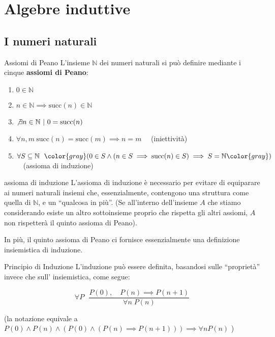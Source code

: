 \documentclass[a4paper,11pt]{report}
\begin{document}
\makefrontpage

\tableofcontents

\chapter{Algebre induttive}

\section{I numeri naturali}

\begin{defbox}{Assiomi di Peano}{}
    L'insieme \(\mathbb{N}\) dei numeri naturali si può definire mediante i cinque \textbf{assiomi di Peano}:
    \begin{enumerate}
        \item \( 0 \in \mathbb{N} \)
        \item \( n \in  \mathbb{N} \implies \text{succ}(n) \in \mathbb{N} \)
        \item \( \not\exists n \in \mathbb{N} \ | \ 0 = \text{succ}(n) \)
        \item \( \forall n, m \ \text{succ}(n) = \text{succ}(m) \implies n = m \) \ \  {\color{gray}\small (iniettività)}
        \item \( \forall S \subseteq \mathbb{N} \ \ {\color{gray}(}0 \in S \land (n \in S \implies \text{succ}(n)\in S) \implies S = \mathbb{N}{\color{gray})}\) \ \ {\color{gray}\small (assioma di induzione)}

    \end{enumerate} 

    \begin{gbox}{assioma di induzione}
        L'assioma di induzione è necessario per evitare di equiparare ai numeri naturali insiemi che, essenzialmente, contengono una struttura come quella di \( \mathbb{N} \), e un ``qualcosa in più''. (Se all'interno dell'insieme \( A \) che stiamo considerando esiste un altro sottoinsieme proprio che rispetta gli altri assiomi, \( A \) non rispetterà il quinto assioma di Peano). 

        In più, il quinto assioma di Peano ci fornisce essenzialmente una definizione insiemistica di induzione.
    \end{gbox}

\end{defbox}


\begin{defbox}{Principio di Induzione}{}
    L'induzione può essere definita, basandosi sulle ``proprietà'' invece che 
    sull' insiemistica, come segue:

    \[
        \forall P \ \ \ \frac{P(0), \quad P(n) \implies P(n+1)}{\forall n\; P(n)}
    \]

    (la notazione equivale a \( P(0) \land P(n) \land (P(0) \land (P(n) \implies P(n+1)))  \implies \forall n P(n) \) )

\end{defbox}
\end{document}
